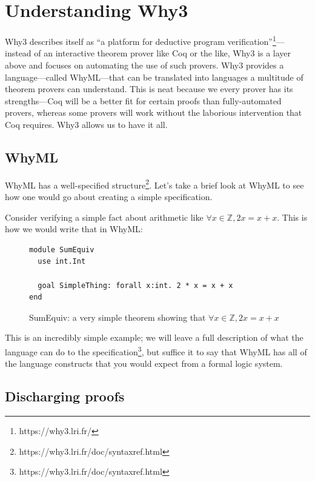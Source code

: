 \documentclass[12pt]{article}
\begin{document}

\section{Understanding Why3}
\label{why-why3}

Why3 describes itself as ``a platform for deductive program verification''\footnote{https://why3.lri.fr/}---instead of an interactive theorem prover like Coq or the like, Why3 is a layer above and focuses on automating the use of such provers.\cite{bobotWhy3ShepherdYour}
Why3 provides a language---called WhyML---that can be translated into languages a multitude of theorem provers can understand.
This is neat because we every prover has its strengths---Coq will be a better fit for certain proofs than fully-automated provers, whereas some provers will work without the laborious intervention that Coq requires.
Why3 allows us to have it all.

\subsection{WhyML}

WhyML has a well-specified structure\footnote{https://why3.lri.fr/doc/syntaxref.html}.
Let's take a brief look at WhyML to see how one would go about creating a simple specification.

Consider verifying a simple fact about arithmetic like $\forall x \in \mathbb{Z}, 2x = x + x$.
This is how we would write that in WhyML:

\begin{figure}[h]
\centering
\begin{verbatim}
module SumEquiv
  use int.Int
  
  goal SimpleThing: forall x:int. 2 * x = x + x
end
\end{verbatim}
\caption{SumEquiv: a very simple theorem showing that $\forall x \in \mathbb{Z}, 2x = x + x$}
\label{fig:sumequiv}
\end{figure}

This is an incredibly simple example; we will leave a full description of what the language can do to the specification\footnote{https://why3.lri.fr/doc/syntaxref.html}, but suffice it to say that WhyML has all of the language constructs that you would expect from a formal logic system.


\subsection{Discharging proofs}
\end{document}
